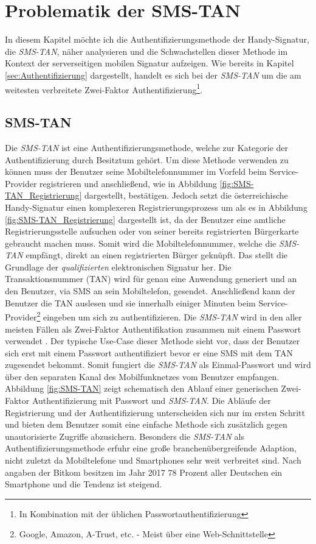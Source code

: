 \documentclass[11pt,a4paper,ngerman]{scrreprt}
\begin{document}
\chapter{Problematik der SMS-TAN}
In diesem Kapitel möchte ich die Authentifizierungsmethode der Handy-Signatur, die \textit{SMS-TAN}, näher analysieren und die Schwachstellen dieser Methode im Kontext der serverseitigen mobilen Signatur aufzeigen. Wie bereits in Kapitel \ref{sec:Authentifizierung} dargestellt, handelt es sich bei der \textit{SMS-TAN} um die am weitesten verbreitete Zwei-Faktor Authentifizierung\footnote{In Kombination mit der üblichen Passwortauthentifizierung}. 

\section{SMS-TAN}
Die \textit{SMS-TAN} ist eine Authentifizierungsmethode, welche zur Kategorie der Authentifizierung durch Besitztum gehört. Um diese Methode verwenden zu können muss der Benutzer seine Mobiltelefonnummer im Vorfeld beim Service-Provider registrieren und anschließend, wie in Abbildung \ref{fig:SMS-TAN_Registrierung} dargestellt, bestätigen. Jedoch setzt die österreichische Handy-Signatur einen komplexeren Registrierungsprozess um als es in Abbildung \ref{fig:SMS-TAN_Registrierung} dargestellt ist, da der Benutzer eine amtliche Registrierungsstelle aufsuchen oder von seiner bereits registrierten Bürgerkarte gebraucht machen muss. Somit wird die Mobiltelefonnummer, welche die \textit{SMS-TAN} empfängt, direkt an einen registrierten Bürger geknüpft. Das stellt die Grundlage der \emph{qualifizierten} elektronischen Signatur her. Die Transaktionsnummer (TAN) wird für genau eine Anwendung generiert und an den Benutzer, via SMS an sein Mobiltelefon, gesendet. Anschließend kann der Benutzer die TAN auslesen und sie innerhalb einiger Minuten beim Service-Provider\footnote{Google, Amazon, A-Trust, etc. - Meist über eine Web-Schnittstelle} eingeben um sich zu authentifizieren. Die \textit{SMS-TAN} wird in den aller meisten Fällen als Zwei-Faktor Authentifikation zusammen mit einem Passwort verwendet \cite{fido17}. Der typische Use-Case dieser Methode sieht vor, dass der Benutzer sich erst mit einem Passwort authentifiziert bevor er eine SMS mit dem TAN zugesendet bekommt. Somit fungiert die \textit{SMS-TAN} als Einmal-Passwort und wird über den separaten Kanal des Mobilfunknetzes vom Benutzer empfangen. Abbildung \ref{fig:SMS-TAN} zeigt schematisch den Ablauf einer generischen Zwei-Faktor Authentifizierung mit Passwort und \textit{SMS-TAN}. Die Abläufe der Registrierung und der Authentifizierung unterscheiden sich nur im ersten Schritt und bieten dem Benutzer somit eine einfache Methode sich zusätzlich gegen unautorisierte Zugriffe abzusichern. Besonders die \textit{SMS-TAN} als Authentifizierungsmethode erfuhr eine große branchenübergreifende Adaption, nicht zuletzt da Mobiltelefone und Smartphones sehr weit verbreitet sind. Nach angaben der Bitkom besitzen im Jahr 2017 78 Prozent aller Deutschen ein Smartphone \cite{bitkomMob} und die Tendenz ist steigend.
\end{document}
